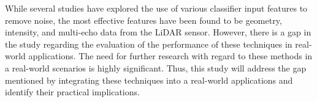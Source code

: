 While several studies have explored the use of various classifier input features to remove noise, the most effective features have been found to be geometry, intensity, and multi-echo data from the LiDAR sensor. However, there is a gap in the study regarding the evaluation of the performance of these techniques in real-world applications. The need for further research with regard to these methods in a real-world scenarios is highly significant. Thus, this study will address the gap mentioned by integrating these techniques into a real-world applications and identify their practical implications.